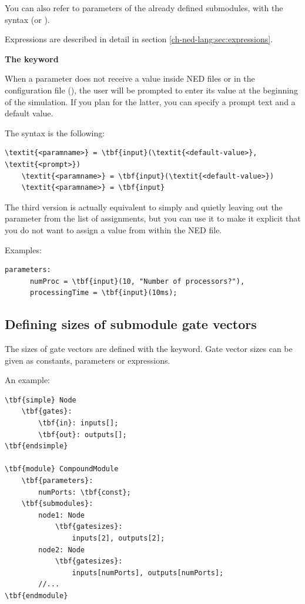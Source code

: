 You can also refer to parameters of the already defined submodules,
with the syntax 
(or ).

Expressions are described in detail in section \ref{ch-ned-lang:sec:expressions}.


\textbf{The  keyword}
\label{sec:ch-ned-lang:input}

When a parameter does not receive a value inside NED files or in
the configuration file (), the user will be prompted
to enter its value at the beginning of the simulation.
If you plan for the latter, you can specify a prompt text and a default value.

The syntax is the following:

\begin{Verbatim}[commandchars=\\\{\}]
    \textit{<paramname>} = \tbf{input}(\textit{<default-value>}, \textit{<prompt>})
    \textit{<paramname>} = \tbf{input}(\textit{<default-value>})
    \textit{<paramname>} = \tbf{input}
\end{Verbatim}

The third version is actually equivalent to simply and quietly
leaving out the parameter from the list of assignments, but
you can use it to make it explicit that you do not want to
assign a value from within the NED file.

Examples:

\begin{Verbatim}[commandchars=\\\{\}]
   parameters:
      numProc = \tbf{input}(10, "Number of processors?"),
      processingTime = \tbf{input}(10ms);
\end{Verbatim}



\subsection{Defining sizes of submodule gate vectors}


The sizes of gate vectors are defined with the
 keyword.  Gate vector sizes
can be given as constants, parameters or expressions.

An example:

\begin{Verbatim}[commandchars=\\\{\}]
\tbf{simple} Node
    \tbf{gates}:
        \tbf{in}: inputs[];
        \tbf{out}: outputs[];
\tbf{endsimple}

\tbf{module} CompoundModule
    \tbf{parameters}:
        numPorts: \tbf{const};
    \tbf{submodules}:
        node1: Node
            \tbf{gatesizes}:
                inputs[2], outputs[2];
        node2: Node
            \tbf{gatesizes}:
                inputs[numPorts], outputs[numPorts];
        //...
\tbf{endmodule}
\end{Verbatim}


